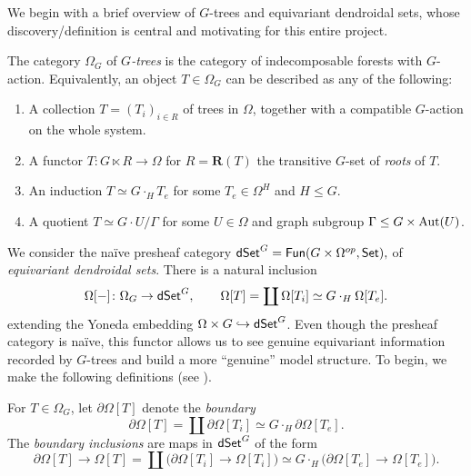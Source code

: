 \documentclass[a4paper,10pt
,draft
]{article}%
\renewcommand{\1}{\eta}%
\begin{document}
We begin with a brief overview of $G$-trees and equivariant dendroidal sets, whose discovery/definition is central and motivating for this entire project.

\begin{definition}
      The category $\Omega_G$ of \textit{$G$-trees} is the category of indecomposable forests with $G$-action.
      Equivalently, an object $T \in \Omega_G$ can be described as any of the following:
      \begin{enumerate}[label = (\roman*)]
      \item A collection $T = (T_i)_{i \in R}$ of trees in $\Omega$, together with a compatible $G$-action on the whole system.
      \item A functor $T: G \ltimes R \to \Omega$ for $R = \mathbf R(T)$ the transitive $G$-set of \textit{roots} of $T$.
      \item An induction $T \simeq G \cdot_H T_e$ for some $T_e \in \Omega^H$ and $H \leq G$.
      \item A quotient $T \simeq G \cdot U / \Gamma$ for some $U \in \Omega$ and graph subgroup $\Gamma \leq G \times \operatorname{Aut}(U)$.
      \end{enumerate}
\end{definition}

We consider the na\"ive presheaf category 
$
\mathsf{dSet}^G = \mathsf{Fun}(G \times \Omega^{op}, \mathsf{Set}),
$
of \textit{equivariant dendroidal sets}.
There is a natural inclusion
\[
      \Omega[-] \colon \Omega_G \to \mathsf{dSet}^G,
      \qquad
      \Omega[T] = \coprod \Omega[T_i] \simeq G \cdot_H \Omega[T_e].
\]
extending the Yoneda embedding $\Omega \times G \hookrightarrow \mathsf{dSet}^G$.
Even though the presheaf category is na\"ive, this functor allows us to see genuine equivariant information recorded by $G$-trees
and build a more ``genuine'' model structure.
To begin, we make the following definitions (see \cite[\S 6]{Per18}).

\begin{definition}
      For $T \in \Omega_G$, let $\partial \Omega[T]$ denote the \textit{boundary}
      \[
            \partial \Omega[T] = \coprod \partial \Omega[T_i] \simeq G \cdot_H \partial \Omega[T_e].
      \]
      The \textit{boundary inclusions} are maps in $\mathsf{dSet}^G$ of the form
      \[
            \partial \Omega[T] \to \Omega[T] =
            \coprod \big( \partial \Omega[T_i] \to \Omega[T_i]\big) \simeq
            G \cdot_H \big( \partial \Omega[T_e] \to \Omega[T_e] \big).
      \]
\end{definition}
\end{document}
